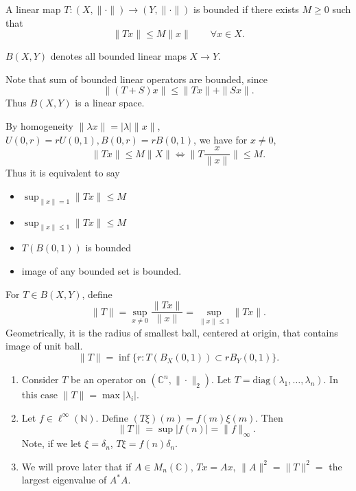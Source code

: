 
\begin{definition}
	\label{defn:BoundedLinearOperator}
	A linear map $T: (X, \|\cdot \|) \to (Y, \|\cdot \|)$ is bounded if there exists $M \ge  0$ such that
	\[
		\|T x\| \le  M \|x\| \qquad \forall  x \in X
	.\] 
\end{definition}

\begin{notation}
	$B(X,Y)$ denotes all bounded linear maps $X \to Y$.
\end{notation}

Note that sum of bounded linear operators are bounded, since
\[
	\|(T + S) x\| \le  \|T x\|+ \|S x\|
.\] 
Thus $B(X, Y)$ is a linear space.

\begin{remark}
	By homogeneity $\|\lambda x\| = |\lambda| \|x\|$, $U(0,r) = r U(0,1), B(0,r) = r B(0,1)$, we have for $x \neq 0$,
	\[
		\|T x\| \le  M \|X\| \iff \|T \frac{x}{\|x\|}\| \le  M
	.\] 
	Thus it is equivalent to say
	\begin{itemize}
		\item $\sup _{\|x\| = 1} \| T x \| \le  M$
		\item $\sup _{\|x\| \le 1} \| T x \| \le  M$
		\item $T(B(0,1))$ is bounded
		\item image of any bounded set is bounded.
	\end{itemize}
\end{remark}

\begin{definition}
	\label{defn:NormOfBoundedOperator}
	For $T \in B(X, Y)$, define
	\[
		\|T\| = \sup _{x \neq 0} \frac{\|T x\|}{\|x\|} 
		=
		\sup _{\|x\|\le 1} \|T x\|
	.\] 
	Geometrically, it is the radius of smallest ball, centered at origin, that contains image of unit ball.
	\[
		\|T\| = \inf  \{r: T\left( B_X(0,1) \right) \subset r B_Y(0,1)\} 
	.\] 
\end{definition}

\begin{example}
	\begin{enumerate}
		\item 
	 Consider $T$ be an operator on  $\left( \mathbb{C}^n, \|\cdot \|_2 \right) $. Let $T = \text{diag}(\lambda_1, \ldots, \lambda_n)$. In this case $\|T\| =\max |\lambda_i|$.
 \item Let $f \in \ell^\infty (\mathbb{N})$. Define  $(T \xi)(m) = f(m) \xi(m)$. Then
	 \[
	 	\|T\| = \sup |f(n)|= \|f\|_\infty 
	 .\] 
	 Note, if we let $\xi = \delta_n$, $T \xi = f(n) \delta_n$.
 \item We will prove later that if $A \in M_n(\mathbb{C})$, $Tx = A x$, $\|A\|^2 = \|T\|^2 =$ the largest eigenvalue of $A^* A$.
	\end{enumerate}
\end{example}

